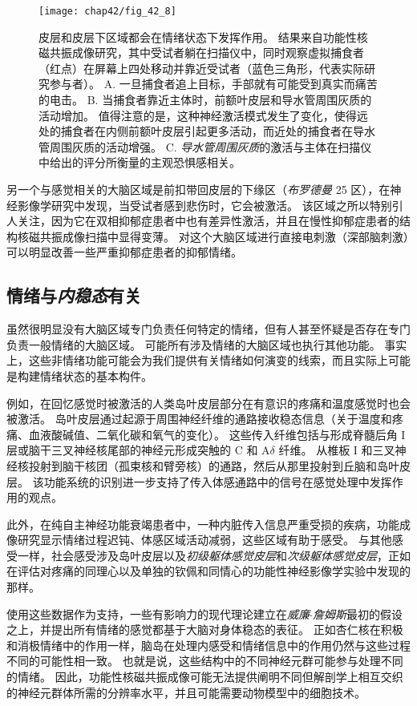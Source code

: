 \begin{figure}[htbp]
	\centering
	\texttt{[image: chap42/fig\_42\_8]}
	\caption{皮层和皮层下区域都会在情绪状态下发挥作用。
		结果来自功能性核磁共振成像研究，其中受试者躺在扫描仪中，同时观察虚拟捕食者（红点）在屏幕上四处移动并靠近受试者（蓝色三角形，代表实际研究参与者）。
		A. 一旦捕食者追上目标，手部就有可能受到真实而痛苦的电击。
		B. 当捕食者靠近主体时，前额叶皮层和导水管周围灰质的活动增加。
		值得注意的是，这种神经激活模式发生了变化，使得远处的捕食者在内侧前额叶皮层引起更多活动，而近处的捕食者在导水管周围灰质的活动增强。
		C. \textit{导水管周围灰质}的激活与主体在扫描仪中给出的评分所衡量的主观恐惧感相关。}
	\label{fig:42_8}
\end{figure}


另一个与感觉相关的大脑区域是前扣带回皮层的下缘区（\textit{布罗德曼} 25 区），在神经影像学研究中发现，当受试者感到悲伤时，它会被激活。
该区域之所以特别引人关注，因为它在双相抑郁症患者中也有差异性激活，并且在慢性抑郁症患者的结构核磁共振成像扫描中显得变薄。
对这个大脑区域进行直接电刺激（深部脑刺激）可以明显改善一些严重抑郁症患者的抑郁情绪。



\subsection{情绪与\textit{内稳态}有关}

虽然很明显没有大脑区域专门负责任何特定的情绪，但有人甚至怀疑是否存在专门负责一般情绪的大脑区域。
可能所有涉及情绪的大脑区域也执行其他功能。
事实上，这些非情绪功能可能会为我们提供有关情绪如何演变的线索，而且实际上可能是构建情绪状态的基本构件。


例如，在回忆感觉时被激活的人类岛叶皮层部分在有意识的疼痛和温度感觉时也会被激活。
岛叶皮层通过起源于周围神经纤维的通路接收稳态信息（关于温度和疼痛、血液酸碱值、二氧化碳和氧气的变化）。
这些传入纤维包括与形成脊髓后角 I 层或脑干三叉神经核尾部的神经元形成突触的 C 和 A$ \delta $ 纤维。
从椎板 I 和三叉神经核投射到脑干核团（孤束核和臂旁核）的通路，然后从那里投射到丘脑和岛叶皮层。
该功能系统的识别进一步支持了传入体感通路中的信号在感觉处理中发挥作用的观点。


此外，在纯自主神经功能衰竭患者中，一种内脏传入信息严重受损的疾病，功能成像研究显示情绪过程迟钝、体感区域活动减弱，这些区域有助于感受。
与其他感受一样，社会感受涉及岛叶皮层以及\textit{初级躯体感觉皮层}和\textit{次级躯体感觉皮层}，正如在评估对疼痛的同理心以及单独的钦佩和同情心的功能性神经影像学实验中发现的那样。


使用这些数据作为支持，一些有影响力的现代理论建立在\textit{威廉$\cdot$詹姆斯}最初的假设之上，并提出所有情绪的感觉都基于大脑对身体稳态的表征。
正如杏仁核在积极和消极情绪中的作用一样，脑岛在处理内感受和情绪信息中的作用仍然与这些过程不同的可能性相一致。
也就是说，这些结构中的不同神经元群可能参与处理不同的情绪。
因此，功能性核磁共振成像可能无法提供阐明不同但解剖学上相互交织的神经元群体所需的分辨率水平，并且可能需要动物模型中的细胞技术。


